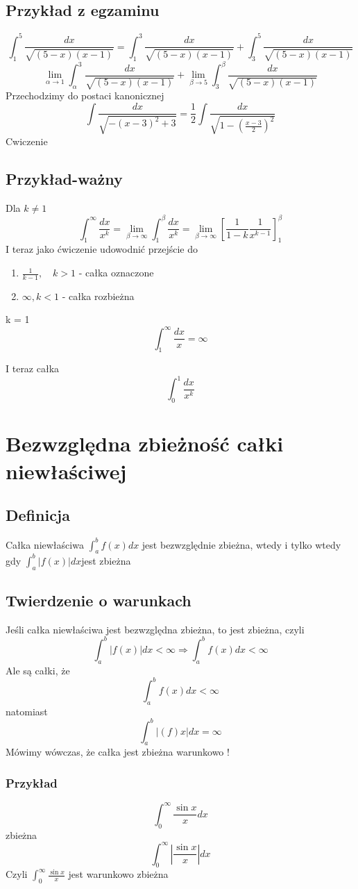 \documentclass[11pt]{article}
\begin{document}
\subsection{Przykład z egzaminu}
$$\int_1^5 \frac{dx}{\sqrt{(5-x)(x-1)}} = \int_1^3 \frac{dx}{\sqrt{(5-x)(x-1)}} + \int_3^5 \frac{dx}{\sqrt{(5-x)(x-1)}}$$
$$\lim_{\alpha \to 1}{\int_\alpha^3 \frac{dx}{\sqrt{(5-x)(x-1)}}} + \lim_{\beta \to 5}{\int_3^\beta \frac{dx}{\sqrt{(5-x)(x-1)}}}$$
Przechodzimy do postaci kanonicznej
$$ \int \frac{dx}{\sqrt{-(x-3)^2 + 3}} =\frac{1}{2} \int \frac{dx}{\sqrt{1 - \left(\frac{x-3}{2}\right)^2}} $$
Cwiczenie
\subsection{Przykład-ważny}
Dla $k \not = 1 $
$$\int_1^{\infty}\frac{dx}{x^k} = \lim_{\beta \to \infty}{\int_1^{\beta}\frac{dx}{x^k}}= \lim_{\beta \to \infty}{ \left[ \frac{1}{1-k} \frac{1}{x^{k-1}} \right]_1^{\beta}}$$
I teraz jako ćwiczenie udowodnić przejście do 
\begin{enumerate}
\item{$\frac{1}{k-1} , \quad k > 1$ - całka oznaczone}
\item{$\infty , k < 1$ - całka rozbieżna}
\end{enumerate}
k = 1
$$\int_1^{\infty} \frac{dx}{x} = \infty$$

I teraz całka
$$\int_0^1 \frac{dx}{x^k}$$

\section{Bezwzględna zbieżność całki niewłaściwej}
\subsection{Definicja}
Całka niewłaściwa $ \int_a^b f(x)dx $ jest bezwzględnie zbieżna, wtedy i tylko wtedy gdy $\int_a^b |f(x)|dx $jest zbieżna
\subsection{Twierdzenie o warunkach}
Jeśli całka niewłaściwa jest bezwzględna zbieżna, to jest zbieżna, czyli 
$$ \int_a^b |f(x)|dx < \infty \Rightarrow \int_a^b f(x)dx < \infty $$
Ale  są całki, że $$ \int_a^b f(x)dx < \infty$$ natomiast $$\int_a^b |(f)x|dx = \infty$$
Mówimy wówczas, że całka jest zbieżna warunkowo !
\subsubsection{Przykład}
$$\int_0^{\infty} \frac{\sin{x}}{x}dx $$
zbieżna
$$\int_0^{\infty} |\frac{\sin{x}}{x}| dx $$
Czyli $ \int_0^{\infty}{\frac{\sin{x}}{x}}$ jest warunkowo zbieżna
\end{document}
